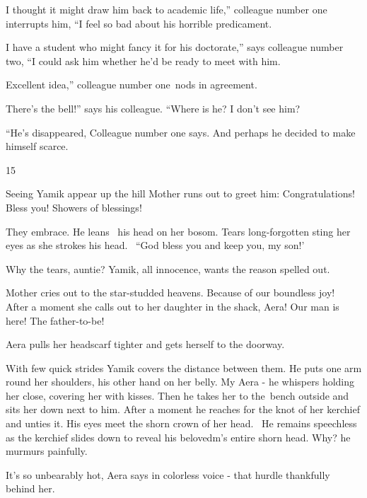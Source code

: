 \documentclass[letterpaper]{article}
\begin{document}
{\textquotedbl}I thought it might draw him back to academic life,'' colleague number one interrupts him, ``I feel so bad
about his horrible predicament.{\textquotedbl} 

{\textquotedbl}I have a student who might fancy it for his doctorate,'' says colleague number two, ``I could ask him
whether he'd be ready to meet with him.{\textquotedbl} 

{\textquotedbl}Excellent idea,'' colleague number one~nods in agreement. 

{\textquotedbl}There's the bell!'' says his colleague. ``Where is he? I don't see him?{\textquotedbl} 

{}``He's disappeared,{\textquotedbl} Colleague number one says. {\textquotedbl}And perhaps he decided to make himself
scarce.{\textquotedbl}


\bigskip

15~~

Seeing Yamik appear up the hill Mother runs out to greet him: {\textquotedbl}Congratulations! Bless you! Showers of
blessings!{\textquotedbl} 

They embrace. He leans \ his head on her bosom. Tears long-forgotten sting her eyes as she strokes his head. \ {}``God
bless you and keep you, my son!' 

{\textquotedbl}Why the tears, auntie?{\textquotedbl} Yamik, all innocence, wants the reason spelled out. 

Mother cries out to the star-studded heavens. {\textquotedbl}Because of our boundless joy!{\textquotedbl}~ After a
moment she calls out to her daughter in the shack, {\textquotedbl}Aera! Our man is here! The
father-to-be!{\textquotedbl}

Aera pulls her headscarf tighter and gets herself to the doorway.

With few quick strides Yamik covers the distance between them. He puts one arm round her shoulders, his other hand on
her belly. {\textquotedbl}My Aera -{\textquotedbl} he whispers holding her close, covering her with kisses. Then he
takes her to the~bench outside and sits her down next to him. After a moment he reaches for the knot of her kerchief
and unties it. His eyes meet the shorn crown of her head. \ He remains speechless as the kerchief slides down to reveal
his belovedm's entire shorn head. {\textquotedbl}Why?{\textquotedbl} he murmurs painfully. 

{\textquotedbl}It's so unbearably hot,{\textquotedbl} Aera says in colorless voice - that hurdle thankfully behind her. 
\end{document}
